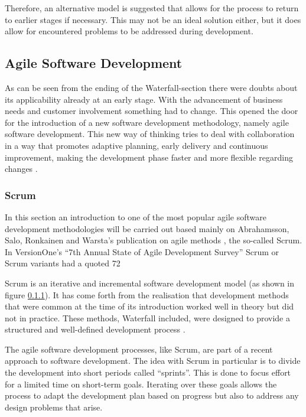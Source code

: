 Therefore, an alternative model is suggested that allows for the process to return to earlier stages if necessary. This may not be an ideal solution either, but it does allow for encountered problems to be addressed during development.

\subsection{Agile Software Development}

As can be seen from the ending of the Waterfall-section there were doubts about its applicability already at an early stage. With the advancement of business needs and customer involvement something had to change. This opened the door for the introduction of a new software development methodology, namely agile software development. This new way of thinking tries to deal with collaboration in a way that promotes adaptive planning, early delivery and continuous improvement, making the development phase faster and more flexible regarding changes \cite{abrahamsson2002}.

\subsubsection{Scrum}
\label{scrum}

In this section an introduction to one of the most popular agile software development methodologies will be carried out based mainly on Abrahamsson, Salo, Ronkainen and Warsta's publication on agile methods \cite{abrahamsson2002}, the so-called Scrum. In VersionOne's ``7th Annual State of Agile Development Survey'' Scrum or Scrum variants had a quoted 72%

Scrum is an iterative and incremental software development model (as shown in figure \ref{scrum}). It has come forth from the realisation that development methods that were common at the time of its introduction worked well in theory but did not in practice. These methods, Waterfall included, were designed to provide a structured and well-defined development process \cite{scrum}.

The agile software development processes, like Scrum, are part of a recent approach to software development. The idea with Scrum in particular is to divide the development into short periods called ``sprints''. This is done to focus effort for a limited time on short-term goals. Iterating over these goals allows the process to adapt the development plan based on progress but also to address any design problems that arise.

